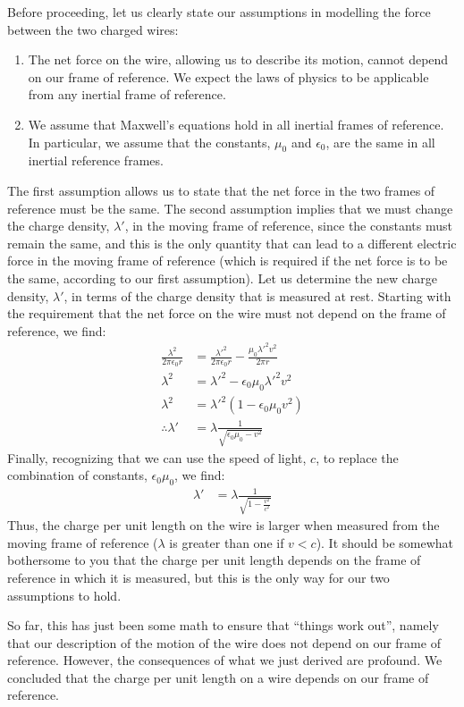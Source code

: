 Before proceeding, let us clearly state our assumptions in modelling the force between the two charged wires:
\begin{enumerate}
\item The net force on the wire, allowing us to describe its motion, cannot depend on our frame of reference. We expect the laws of physics to be applicable from any inertial frame of reference.
\item We assume that Maxwell's equations hold in all inertial frames of reference. In particular, we assume that the constants, $\mu_0$ and $\epsilon_0$, are the same in all inertial reference frames.
\end{enumerate}
The first assumption allows us to state that the net force in the two frames of reference must be the same. The second assumption implies that we must change the charge density, $\lambda'$, in the moving frame of reference, since the constants must remain the same, and this is the only quantity that can lead to a different electric force in the moving frame of reference (which is required if the net force is to be the same, according to our first assumption). Let us determine the new charge density, $\lambda'$, in terms of the charge density that is measured at rest. Starting with the requirement that the net force on the wire must not depend on the frame of reference, we find:
\begin{align*}
\frac{\lambda^2}{2\pi \epsilon_0r}&=\frac{\lambda'^2}{2\pi \epsilon_0r}  -\frac{\mu_0 \lambda'^2 v^2}{2\pi r}\\
\lambda^2&=\lambda'^2-\epsilon_0\mu_0\lambda'^2 v^2\\
\lambda^2&=\lambda'^2(1-\epsilon_0\mu_0v^2)\\
\therefore \lambda'&=\lambda \frac{1}{\sqrt{\epsilon_0\mu_0-v^2}}
\end{align*}
Finally, recognizing that we can use the speed of light, $c$, to replace the combination of constants, $\epsilon_0\mu_0$, we find:
\begin{align*}
\lambda'&=\lambda \frac{1}{\sqrt{1-\frac{v^2}{c^2}}}
\end{align*}
Thus, the charge per unit length on the wire is larger when measured from the moving frame of reference ($\lambda$ is greater than one if $v<c$). It should be somewhat bothersome to you that the charge per unit length depends on the frame of reference in which it is measured, but this is the only way for our two assumptions to hold.

So far, this has just been some math to ensure that ``things work out'', namely that our description of the motion of the wire does not depend on our frame of reference. However, the consequences of what we just derived are profound. We concluded that the charge per unit length on a wire depends on our frame of reference.

